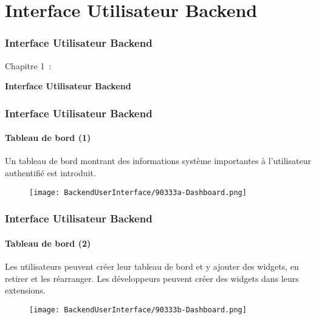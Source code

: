 %

\section{Interface Utilisateur Backend}
\begin{frame}[fragile]
	\frametitle{Interface Utilisateur Backend}

	\begin{center}\huge{Chapitre 1~:}\end{center}
	\begin{center}\huge{\color{typo3darkgrey}\textbf{Interface Utilisateur Backend}}\end{center}

\end{frame}


\begin{frame}[fragile]
	\frametitle{Interface Utilisateur Backend}
	\framesubtitle{Tableau de bord (1)}

	Un tableau de bord montrant des informations système importantes à l'utilisateur
	authentifié est introduit.

	\begin{figure}
		\texttt{[image: BackendUserInterface/90333a-Dashboard.png]}
	\end{figure}

\end{frame}


\begin{frame}[fragile]
	\frametitle{Interface Utilisateur Backend}
	\framesubtitle{Tableau de bord (2)}

	Les utilisateurs peuvent créer leur tableau de bord et y ajouter des
	widgets, en retirer et les réarranger.
	Les développeurs peuvent créer des widgets dans leurs extensions.

	\begin{figure}
		\texttt{[image: BackendUserInterface/90333b-Dashboard.png]}
	\end{figure}

\end{frame}

